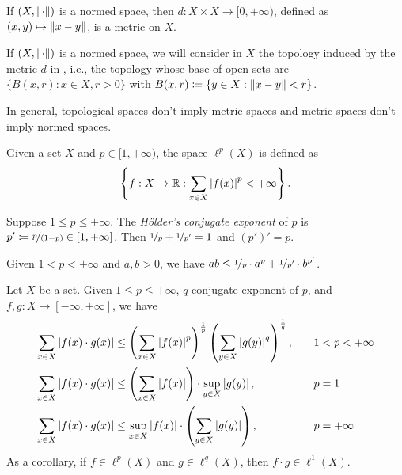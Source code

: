 \documentclass{techreport}
\begin{document}
\begin{proposition}\label{Prop:NormInduceMetric}
	If $(X,\left\|{\cdot}\right\|)$ is a normed space, then $d : X \times X \to [0,+\infty)$, defined as $(x,y) \mapsto \left\|{x-y}\right\|$, is a metric on $X$.
\end{proposition}

\begin{remark}\label{Rem:NormedBalls}
	If $(X,\left\|{\cdot}\right\|)$ is a normed space, we will consider in $X$ the topology induced by the metric $d$ in , i.e., the topology whose base of open sets are $\{ B(x,r) : x \in X, r > 0 \}$ with $B(x,r) \coloneqq \{ y \in X : \left\|{x-y}\right\| < r \}$.
\end{remark}

\begin{remark}\label{Rem:MetricNotImplyNorm}
	In general, topological spaces don't imply metric spaces and metric spaces don't imply normed spaces.
\end{remark}

\begin{definition}\label{De:lpSpaces}
	Given a set $X$ and $p \in [1,+\infty)$, the space $\ell^p(X)$ is defined as
	\begin{equation*}
		\left\{ { f : X \to \mathbb{R} : \sum_{x \in X} \left|{f(x)}\right|^p < +\infty } \right\}.
	\end{equation*}
\end{definition}

\begin{definition}\label{De:HoldersConjugateExponent}
	Suppose $1 \le p \le +\infty$.
	The \emph{H{\"o}lder's conjugate exponent} of $p$ is $p' \coloneqq \nicefrac{p}{(1-p)} \in [1,+\infty]$.
	Then $\nicefrac{1}{p} + \nicefrac{1}{p'}=1$ and $(p')' = p$.
\end{definition}

\begin{theorem}\label{The:YangsInequality}
	Given $1 < p < +\infty$ and $a,b > 0$, we have $ab \le \nicefrac{1}{p}  \cdot a^p + \nicefrac{1}{p'} \cdot b^{p'}$.
\end{theorem}

\begin{theorem}\label{The:HoldersInequality}
	Let $X$ be a set.
	Given $1 \le p \le +\infty$, $q$ conjugate exponent of $p$, and $f,g: X \to [-\infty,+\infty]$, we have
	\begin{alignat*}{2}
		\sum_{x \in X} \left|{f(x) \cdot g(x)}\right| & \le  \left({ \sum_{x \in X} \left|{f(x)}\right|^p }\right)^{\frac{1}{p}} \left({  \sum_{y \in X} \left|{g(y)}\right|^q }\right)^{\frac{1}{q}}, \quad &&  1 < p < +\infty \\
		\sum_{x \in X} \left|{f(x) \cdot g(x)}\right| & \le \left({ \sum_{x \in X} \left|{f(x)}\right| }\right) \cdot \sup_{y \in X} \left|{g(y)}\right|, \quad &&  p=1 \\
		\sum_{x \in X} \left|{f(x) \cdot g(x)}\right| & \le \sup_{x \in X} \left|{f(x)}\right| \cdot \left({ \sum_{y \in X} \left|{g(y)}\right| }\right), \quad && p=+\infty
	\end{alignat*}
	As a corollary, if $f \in \ell^p(X)$ and $g \in \ell^q(X)$, then $f \cdot g \in \ell^1(X)$.
\end{theorem}
\end{document}
